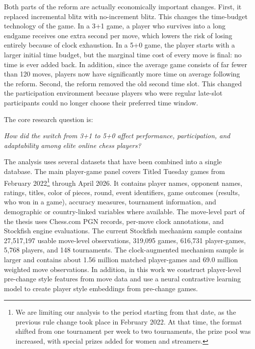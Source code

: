Both parts of the reform are actually economically important changes. First, it replaced incremental blitz with no-increment blitz. This changes the time-budget technology of the game. In a 3+1 game, a player who survives into a long endgame receives one extra second per move, which lowers the risk of losing entirely because of clock exhaustion. In a 5+0 game, the player starts with a larger initial time budget, but the marginal time cost of every move is final: no time is ever added back. In addition, since the average game consists of far fewer than 120 moves, players now have significantly more time on average following the reform. Second, the reform removed the old second time slot. This changed the participation environment because players who were regular late-slot participants could no longer choose their preferred time window.

\begin{tcolorbox}[
    colback=white,
    colframe=blue,
    boxrule=0.6pt,
    arc=1mm,
    left=8pt,
    right=8pt,
    top=6pt,
    bottom=6pt
]

The core research question is:


\textit{How did the switch from 3+1 to 5+0 affect performance, participation, and adaptability among elite online chess players?}
\end{tcolorbox}

The analysis uses several datasets that have been combined into a single database. The main player-game panel covers Titled Tuesday games from February 2022\footnote{We are limiting our analysis to the period starting from that date, as the previous rule change took place in February 2022. At that time, the format shifted from one tournament per week to two tournaments, the prize pool was increased, with special prizes added for women and streamers.} through April 2026. It contains player names, opponent names, ratings, titles, color of pieces, round, event identifiers, game outcomes (results, who won in a game), accuracy measures, tournament information, and demographic or country-linked variables where available. The move-level part of the thesis uses Chess.com PGN records, per-move clock annotations, and Stockfish engine evaluations. The current Stockfish mechanism sample contains 27,517,197 usable move-level observations, 319,095 games, 616,731 player-games, 5,768 players, and 148 tournaments. The clock-augmented mechanism sample is larger and contains about 1.56 million matched player-games and 69.0 million weighted move observations. In addition, in this work we construct player-level pre-change style features from move data and use a neural contrastive learning model to create player style embeddings from pre-change games.

